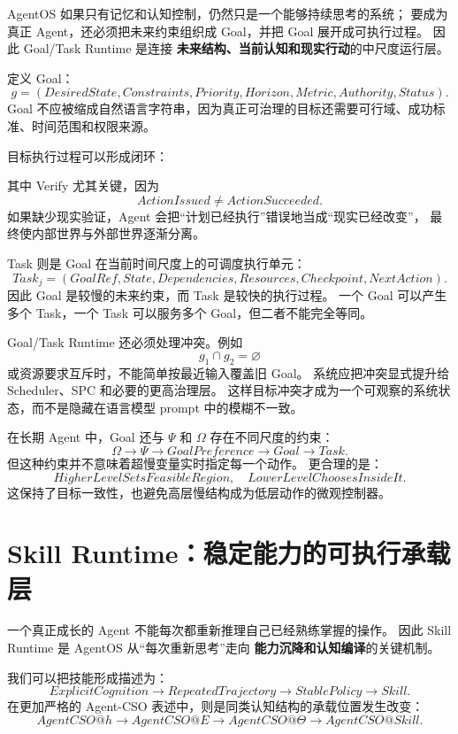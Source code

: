 AgentOS 如果只有记忆和认知控制，仍然只是一个能够持续思考的系统；
要成为真正 Agent，还必须把未来约束组织成 Goal，并把 Goal 展开成可执行过程。
因此 Goal/Task Runtime 是连接
\textbf{未来结构、当前认知和现实行动}的中尺度运行层。

定义 Goal：
\[
g=
(
DesiredState,
Constraints,
Priority,
Horizon,
Metric,
Authority,
Status
).
\]
Goal 不应被缩成自然语言字符串，因为真正可治理的目标还需要可行域、成功标准、时间范围和权限来源。

目标执行过程可以形成闭环：
\begin{statementbox}
\centering
{}
\end{statementbox}
其中 Verify 尤其关键，因为
\[
ActionIssued\neq ActionSucceeded.
\]
如果缺少现实验证，Agent 会把``计划已经执行''错误地当成``现实已经改变''，
最终使内部世界与外部世界逐渐分离。

Task 则是 Goal 在当前时间尺度上的可调度执行单元：
\[
Task_j=
(
GoalRef,
State,
Dependencies,
Resources,
Checkpoint,
NextAction
).
\]
因此 Goal 是较慢的未来约束，而 Task 是较快的执行过程。
一个 Goal 可以产生多个 Task，一个 Task 可以服务多个 Goal，但二者不能完全等同。

Goal/Task Runtime 还必须处理冲突。例如
\[
g_1\cap g_2=\varnothing
\]
或资源要求互斥时，不能简单按最近输入覆盖旧 Goal。
系统应把冲突显式提升给 Scheduler、SPC 和必要的更高治理层。
这样目标冲突才成为一个可观察的系统状态，而不是隐藏在语言模型 prompt 中的模糊不一致。

在长期 Agent 中，Goal 还与 $\Psi$ 和 $\Omega$ 存在不同尺度的约束：
\[
\Omega
\rightarrow
\Psi
\rightarrow
GoalPreference
\rightarrow
Goal
\rightarrow
Task.
\]
但这种约束并不意味着超慢变量实时指定每一个动作。
更合理的是：
\[
\boxed{
HigherLevelSetsFeasibleRegion,
\quad
LowerLevelChoosesInsideIt.
}
\]
这保持了目标一致性，也避免高层慢结构成为低层动作的微观控制器。


\section{Skill Runtime：稳定能力的可执行承载层}

一个真正成长的 Agent 不能每次都重新推理自己已经熟练掌握的操作。
因此 Skill Runtime 是 AgentOS 从``每次重新思考''走向
\textbf{能力沉降和认知编译}的关键机制。

我们可以把技能形成描述为：
\[
ExplicitCognition
\rightarrow
RepeatedTrajectory
\rightarrow
StablePolicy
\rightarrow
Skill.
\]
在更加严格的 Agent-CSO 表述中，则是同类认知结构的承载位置发生改变：
\[
AgentCSO@h
\rightarrow
AgentCSO@E
\rightarrow
AgentCSO@\Theta
\rightarrow
AgentCSO@Skill.
\]

